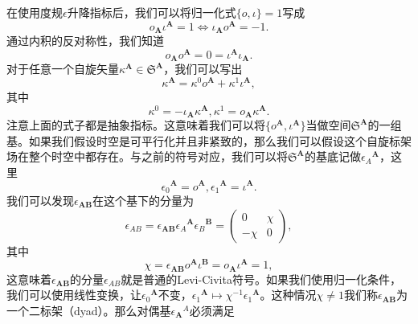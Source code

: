 在使用度规$\epsilon $升降指标后，我们可以将归一化式$\{o,\iota \} =1$写成
\begin{equation*}
	o_{\boldsymbol{A}} \iota ^{\boldsymbol{A}} =1\Leftrightarrow \iota _{\boldsymbol{A}} o^{\boldsymbol{A}} =-1.
\end{equation*}
通过内积的反对称性，我们知道
\begin{equation*}
	o_{\boldsymbol{A}} o^{\boldsymbol{A}} =0=\iota ^{\boldsymbol{A}} \iota _{\boldsymbol{A}} .
\end{equation*}
对于任意一个自旋矢量$\kappa ^{\boldsymbol{A}} \in \mathfrak{S}^{\boldsymbol{A}}$，我们可以写出
\begin{equation*}
	\kappa ^{\boldsymbol{A}} =\kappa ^{0} o^{\boldsymbol{A}} +\kappa ^{1} \iota ^{\boldsymbol{A}} ,
\end{equation*}
其中
\begin{equation*}
	\kappa ^{0} =-\iota _{\boldsymbol{A}} \kappa ^{\boldsymbol{A}} ,\kappa ^{1} =o_{\boldsymbol{A}} \kappa ^{\boldsymbol{A}} .
\end{equation*}
注意上面的式子都是抽象指标。这意味着我们可以将$\{o^{\boldsymbol{A}} ,\iota ^{\boldsymbol{A}} \}$当做空间$\mathfrak{S}^{\boldsymbol{A}}$的一组基。如果我们假设时空是可平行化并且非紧致的，那么我们可以假设这个自旋标架场在整个时空中都存在。与之前的符号对应，我们可以将$\mathfrak{S}^{\boldsymbol{A}}$的基底记做$\epsilon {_{A}}^{\boldsymbol{A}}$，这里
\begin{equation*}
	\epsilon {_{0}}^{\boldsymbol{A}} =o^{\boldsymbol{A}} ,\epsilon {_{1}}^{\boldsymbol{A}} =\iota ^{\boldsymbol{A}} .
\end{equation*}
我们可以发现$\epsilon _{\boldsymbol{AB}}$在这个基下的分量为
\begin{equation*}
	\epsilon _{AB} =\epsilon _{\boldsymbol{AB}} \epsilon {_{A}}^{\boldsymbol{A}} \epsilon {_{B}}^{\boldsymbol{B}} =\begin{pmatrix}
		0 & \chi \\
		-\chi  & 0
	\end{pmatrix} ,
\end{equation*}
其中
\begin{equation*}
	\chi =\epsilon _{\boldsymbol{AB}} o^{\boldsymbol{A}} \iota ^{\boldsymbol{B}} =o_{\boldsymbol{A}} \iota ^{\boldsymbol{A}} =1,
\end{equation*}
这意味着$\epsilon _{\boldsymbol{AB}}$的分量$\epsilon _{AB}$就是普通的Levi-Civita符号。如果我们使用归一化条件，我们可以使用线性变换，让$\epsilon {_{0}}^{\boldsymbol{A}}$不变，$\epsilon {_{1}}^{\boldsymbol{A}} \mapsto \chi ^{-1} \epsilon {_{1}}^{\boldsymbol{A}}$。这种情况$\chi \neq 1$我们称$\epsilon _{\boldsymbol{AB}}$为一个二标架（dyad）。那么对偶基$\epsilon {_{\boldsymbol{A}}}^{A}$必须满足
